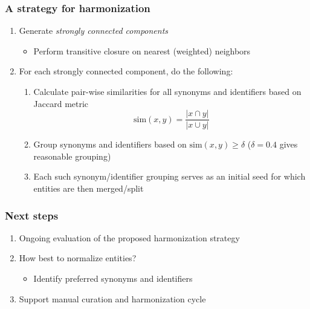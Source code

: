 ﻿\documentclass[anchorcolor=blue,linkcolor=blue]{beamer}
\begin{document}
\begin{frame}
  \frametitle{A strategy for harmonization}
  \begin{enumerate}
  \item Generate \emph{strongly connected components}
    \begin{itemize}
    \item Perform transitive closure on nearest (weighted) neighbors
    \end{itemize}
  \item For each strongly connected component, do the following:
    \begin{enumerate}
    \item Calculate pair-wise similarities for all synonyms and
      identifiers based on Jaccard metric \[\text{sim}(x,y) =
      \frac{|x\cap y|}{|x\cup y|}\]
    \item Group synonyms and identifiers based on $\text{sim}(x,y) \ge
      \delta$ ($\delta=0.4$ gives reasonable grouping)
    \item Each such synonym/identifier grouping serves as an initial
      seed for which entities are then merged/split
    \end{enumerate}
  \end{enumerate}
\end{frame}

\begin{frame}
  \frametitle{Next steps}
  \begin{enumerate}
  \item Ongoing evaluation of the proposed harmonization strategy
  \item How best to normalize entities?
    \begin{itemize}
    \item Identify preferred synonyms and identifiers
    \end{itemize}
  \item Support manual curation and harmonization cycle
  \end{enumerate}
\end{frame}
\end{document}
